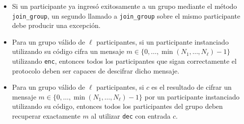\begin{enumerate}
\begin{itemize}
\item \text{[0.25 puntos]} Si un participante ya ingresó exitosamente a un grupo mediante el método \texttt{join\_group}, un segundo llamado a \texttt{join\_group} sobre el mismo participante debe producir una excepción.

\item \text{[1 punto]} Para un grupo válido de $\ell$ participantes, si un participante instanciado utilizando su código cifra un mensaje $m \in \{0, \ldots, \min(N_1,\ldots,N_\ell)-1\}$ utilizando \texttt{enc}, entonces todos los participantes que sigan correctamente el protocolo deben ser capaces de descifrar dicho mensaje.


\item \text{[1 punto]} Para un grupo válido de $\ell$ participantes, si $c$ es el resultado de cifrar un mensaje $m \in \{0, \ldots, \min(N_1,\ldots,N_\ell)-1\}$ por un participante instanciado utilizando su código, entonces todos los participantes del grupo deben recuperar exactamente $m$ al utilizar \texttt{dec} con entrada $c$.
\end{itemize}
\end{enumerate}

